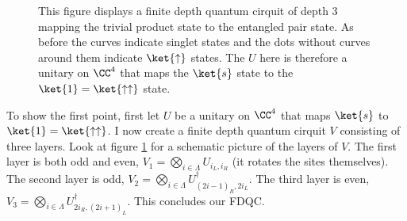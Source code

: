 \begin{figure}
	\centering
	
	\caption{This figure displays a finite depth quantum cirquit of depth 3 mapping the trivial product state to the entangled pair state. As before the curves indicate singlet states and the dots without curves around them indicate $\ket{\uparrow}$ states. The $U$ here is therefore a unitary on $\CC^4$ that maps the $\ket{s}$ state to the $\ket{1}=\ket{\uparrow\uparrow}$ state.}
	\label{fig:FakeAKLT_IsSRE}
\end{figure}
To show the first point, first let $U$ be a unitary on $\CC^4$ that maps $\ket{s}$ to $\ket{1}=\ket{\uparrow\uparrow}$. I now create a finite depth quantum cirquit $V$ consisting of three layers. Look at figure \ref{fig:FakeAKLT_IsSRE} for a schematic picture of the layers of $V$. The first layer is both odd and even, $V_1=\bigotimes_{i\in\Lambda}U_{i_L,i_R}$ (it rotates the sites themselves). The second layer is odd, $V_2=\bigotimes_{i\in\Lambda}U_{(2i-1)_R,2i_L}^\dagger$. The third layer is even, $V_3=\bigotimes_{i\in\Lambda}U_{2i_R,(2i+1)_L}^\dagger$. This concludes our FDQC.
